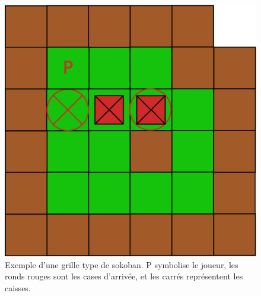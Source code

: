 \documentclass[12pt,a4paper]{article}
\begin{document}
\begin{figure}[!h]
	\centering  
	\includegraphics[scale=0.2]{Diagram1.eps}  
	\caption{
			Exemple d'une grille type de sokoban. P symbolise le joueur, les ronds rouges sont les cases d'arrivée, et les carrés représentent les caisses.
	}
	\label{label-figure1}
\end{figure}
\end{document}

